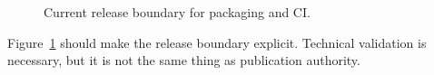 \begin{figure}[htbp]
\centering
\caption{Current release boundary for packaging and CI.}
\label{fig:packaging-release-boundary}
\end{figure}

Figure~\ref{fig:packaging-release-boundary} should make the release boundary
explicit. Technical validation is necessary, but it is not the same thing as
publication authority.
